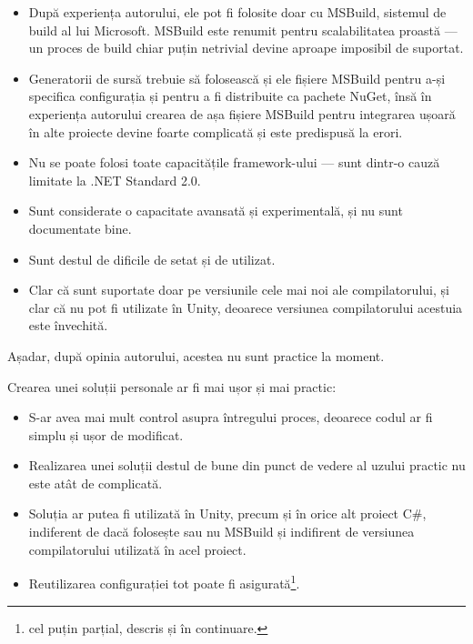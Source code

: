 \documentclass[a4paper,12pt]{report}
\begin{document}
\begin{itemize}

  \item După experiența autorului, ele pot fi folosite doar cu MSBuild, sistemul de build al lui Microsoft.
  MSBuild este renumit pentru scalabilitatea proastă --- un proces de build chiar puțin netrivial devine aproape imposibil de suportat.

  \item Generatorii de sursă trebuie să folosească și ele fișiere MSBuild pentru a-și specifica configurația\cite{source_generators_msbuild_configuration} și pentru a fi distribuite ca pachete NuGet,
    însă în experiența autorului crearea de așa fișiere MSBuild pentru integrarea ușoară în alte proiecte devine foarte complicată și este predispusă la erori.

  \item Nu se poate folosi toate capacitățile framework-ului --- sunt dintr-o cauză limitate la {{.}NET} Standard 2.0.

  \item Sunt considerate o capacitate avansată și experimentală, și nu sunt documentate bine.

  \item Sunt destul de dificile de setat și de utilizat.

  \item Clar că sunt suportate doar pe versiunile cele mai noi ale compilatorului, și clar că nu pot fi utilizate în Unity, deoarece versiunea compilatorului acestuia este învechită.

\end{itemize}

Așadar, după opinia autorului, acestea nu sunt practice la moment.

Crearea unei soluții personale ar fi mai ușor și mai practic:

\begin{itemize}
  \item S-ar avea mai mult control asupra întregului proces, deoarece codul ar fi simplu și ușor de modificat.

  \item Realizarea unei soluții destul de bune din punct de vedere al uzului practic nu este atât de complicată.

  \item Soluția ar putea fi utilizată în Unity, precum și în orice alt proiect C\#, indiferent de dacă folosește sau nu MSBuild și indifirent de versiunea compilatorului utilizată în acel proiect.

  \item Reutilizarea configurației tot poate fi asigurată\footnote{cel puțin parțial, descris și în continuare.}.
\end{itemize}
\end{document}
